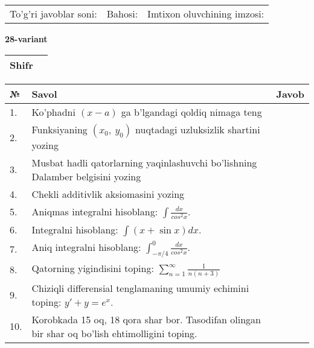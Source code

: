 \documentclass{article}
\begin{document}
  \vspace{1cm}
  
  \begin{tabular}{lll}
  To'g'ri javoblar soni: \underline{\hspace{1.5cm}} & 
  Bahosi: \underline{\hspace{1.5cm}} & 
  Imtixon oluvchining imzosi: \underline{\hspace{2cm}} \\
  \end{tabular}
  
  \egroup
  
  \newpage
  
  
  \textbf{28-variant}\\
  
  \bgroup
  \def\arraystretch{1.6} %
  
  \begin{tabular}{|m{5.7cm}|m{9.5cm}|}
  \hline
  Shifr & \\
  \hline
  \end{tabular}
  
  \vspace{1cm}
  
  \begin{tabular}{|m{0.7cm}|m{10cm}|m{4cm}|}
  \hline
  № & Savol & Javob \\
  \hline
  1. & Ko'phadni \((x - a)\) ga b'lgandagi qoldiq nimaga teng &  \\
  \hline
  2. & Funksiyaning \((x_{0},\ y_{0})\) nuqtadagi uzluksizlik shartini yozing &  \\
  \hline
  3. & Musbat hadli qatorlarning yaqinlashuvchi bo'lishning Dalamber belgisini yozing &  \\
  \hline
  4. & Chekli additivlik aksiomasini yozing &  \\
  \hline
  5. & Aniqmas integralni hisoblang: \(\int \frac{dx}{cos^{2}x}\). &  \\
  \hline
  6. & Integralni hisoblang: \(\int {(x + \sin x)dx}\). &  \\
  \hline
  7. & Aniq integralni hisoblang: \(\int_{- \pi/4}^{0}\frac{dx}{cos^{2}x}\). &  \\
  \hline
  8. & Qatorning yigindisini toping: \(\sum_{n = 1}^{\infty}\frac{1}{n(n + 3)}\) &  \\
  \hline
  9. & Chiziqli differensial tenglamaning umumiy echimini toping: \(y' + y = e^{x}\). &  \\
  \hline
  10. & Korobkada 15 oq, 18 qora shar bor. Tasodifan olingan bir shar oq bo'lish ehtimolligini toping. &  \\
  \hline
  \end{tabular}
  
\end{document}
